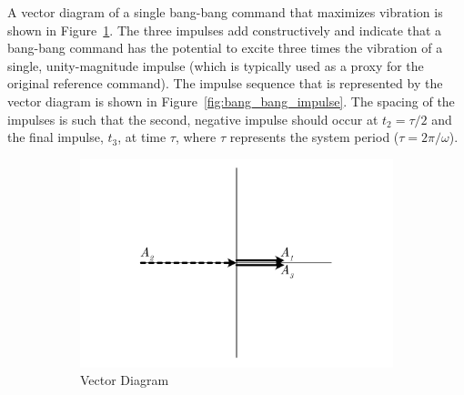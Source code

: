 A vector diagram of a single bang-bang command that maximizes vibration is shown in Figure~\ref{fig:bang_bang_vector}. The three impulses add constructively and indicate that a bang-bang command has the potential to excite three times the vibration of a single, unity-magnitude impulse (which is typically used as a proxy for the original reference command). The impulse sequence that is represented by the vector diagram is shown in Figure~\ref{fig:bang_bang_impulse}. The spacing of the impulses is such that the second, negative impulse should occur at $t_2 = \tau/2$ and the final impulse, $t_3$, at time $\tau$, where $\tau$ represents the system period ($\tau = 2\pi/\omega$).
% 
\begin{figure}[tb!]
  \centering
  \begin{subfigure}{0.5\textwidth}
    \centering
    \includegraphics[width=\textwidth]{Figures/Ch3/input_shaping/bang_bang_vector}
    \caption{Vector Diagram}
    \label{fig:bang_bang_vector}
  \end{subfigure}
  \hfill
  \begin{subfigure}{0.3\textwidth}
    \centering

\end{subfigure}
\end{figure}
